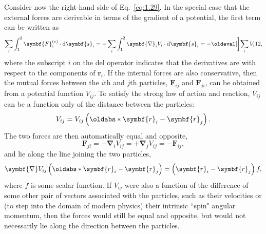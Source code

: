 Consider now the right-hand side of Eq.~\eqref{eq:1.29}. In the special case that the external forces are derivable in terms of the gradient of a potential, the first term can be written as
\begin{equation*}
    \sum_i\int_1^2\symbf{F}_i^{\left(e\right)}\cdot\odif{\symbf{s}_i}=-\sum_i\int_1^2\symbf{\nabla}_iV_i\cdot\odif{\symbf{s}_i}=-\eval[\bigg]{\sum_iV_i}[1][2],
\end{equation*}
where the subscript \(i\) on the del operator indicates that the derivatives are with respect to the components of \(\symbf{r}_i\). If the internal forces are also conservative, then the mutual forces between the \(i\)th and \(j\)th particles, \(\symbf{F}_{ij}\) and \(\symbf{F}_{ji}\), can be obtained from a potential function \(V_{ij}\). To satisfy the strong law of action and reaction, \(V_{ij}\) can be a function only of the distance between the particles:
\begin{equation}
    V_{ij}=V_{ij}\left(\abs[\symbf{r}_i-\symbf{r}_j]\right).
\end{equation}
The two forces are then automatically equal and opposite,
\begin{equation}
    \symbf{F}_{ji}=-\symbf{\nabla}_iV_{ij}=+\symbf{\nabla}_jV_{ij}=-\symbf{F}_{ij},
\end{equation}
and lie along the line joining the two particles,
\begin{equation}
    \symbf{\nabla} V_{ij}\left(\abs[\symbf{r}_i-\symbf{r}_j]\right)=\left(\symbf{r}_i-\symbf{r}_j\right)f,
\end{equation}
where \(f\) is some scalar function. If \(V_{ij}\) were also a function of the difference of some other pair of vectors associated with the particles, such as their velocities or (to step into the domain of modern physics) their intrinsic ``spin" angular momentum, then the forces would still be equal and opposite, but would not necessarily lie along the direction between the particles.

